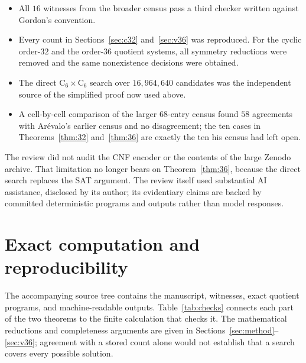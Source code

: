 \documentclass[11pt]{article}
\theoremstyle{remark}
\newcommand{\C}{\mathrm{C}}
\begin{document}
\begin{itemize}
\item All $16$ witnesses from the broader census pass a third checker written
against Gordon's convention.
\item Every count in Sections~\ref{sec:c32} and~\ref{sec:v36} was reproduced.
For the cyclic order-$32$ and the order-$36$ quotient systems, all symmetry
reductions were removed and the same nonexistence decisions were obtained.
\item The direct $\C_6\times\C_6$ search over $16{,}964{,}640$ candidates was
the independent source of the simplified proof now used above.
\item A cell-by-cell comparison of the larger $68$-entry census found $58$
agreements with Ar\'evalo's earlier census and no disagreement; the ten cases
in Theorems~\ref{thm:32} and~\ref{thm:36} are exactly the ten his census had
left open.
\end{itemize}

The review did not audit the CNF encoder or the contents of the large Zenodo
archive.  That limitation no longer bears on Theorem~\ref{thm:36}, because the
direct search replaces the SAT argument.  The review itself used substantial
AI assistance, disclosed by its author; its evidentiary claims are backed by
committed deterministic programs and outputs rather than model responses.

\section{Exact computation and reproducibility}\label{sec:verification}

The accompanying source tree contains the manuscript, witnesses, exact
quotient programs, and machine-readable outputs.  Table~\ref{tab:checks}
connects each part of the two theorems to the finite calculation that checks
it.  The mathematical reductions and completeness arguments are given in
Sections~\ref{sec:method}--\ref{sec:v36}; agreement with a stored count alone
would not establish that a search covers every possible solution.
\end{document}
